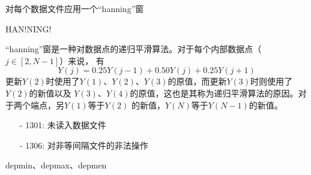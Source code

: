 \label{cmd:hanning}

对每个数据文件应用一个``hanning''窗

\begin{SACSTX}
HAN!NING!
\end{SACSTX}

``hanning''窗是一种对数据点的递归平滑算法。对于每个内部数据点（$j\in[2,N-1]$）来说，
有
\[ 
    Y(j)=0.25Y(j-1)+0.50Y(j)+0.25Y(j+1)
\]
更新$Y(2)$时使用了$Y(1)$、$Y(2)$、$Y(3)$的原值，而更新$Y(3)$时则使用了$Y(2)$的新值以及
$Y(3)$、$Y(4)$的原值，这也是其称为递归平滑算法的原因。对于两个端点，另$Y(1)$等于$Y(2)$
的新值，$Y(N)$等于$Y(N-1)$的新值。

\begin{itemize}
\item[-]1301: 未读入数据文件
\item[-]1306: 对非等间隔文件的非法操作
\end{itemize}

depmin、depmax、depmen
